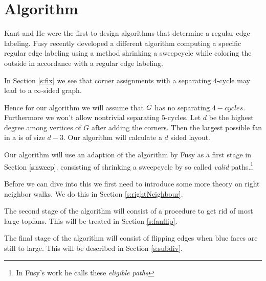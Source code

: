 
\section{Algorithm}
\label{s:algo}
Kant and He \cite{Kant1997} were the first to design algorithms that determine a regular edge labeling. Fusy \cite{Fusy2006} recently developed a different algorithm computing a specific regular edge labeling using a method shrinking a sweepcycle while coloring the outside in accordance with a regular edge labeling.

In Section \ref{s:fix} we see that corner assignments with a separating $4$-cycle may lead to a $\infty$-sided graph.


Hence for our algorithm we will assume that $\bar{G}$ has no separating $4-cycles$. Furthermore we won't allow nontrivial separating $5$-cycles. Let $d$ be the highest degree among vertices of $G$ after adding the corners. Then the largest possible fan in a \rel is of size $d-3$. Our algorithm will calculate a $d$ sided layout.



Our algorithm will use an adaption of the algorithm by Fusy as a first stage in Section \ref{s:sweep}.  consisting of shrinking a sweepcycle by so called \emph{valid} paths.\footnote{In Fusy's work he calls these \emph{eligible paths}}

Before we can dive into this we first need to introduce some more theory on right neighbor walks. We do this in Section \ref{s:rightNeighbour}.

The second stage of the algorithm will consist of a procedure to get rid of most large topfans. This will be treated in Section \ref{s:fanflip}.

The final stage of the algorithm will consist of flipping edges when blue faces are still to large. This will be described in Section \ref{s:subdiv}.
